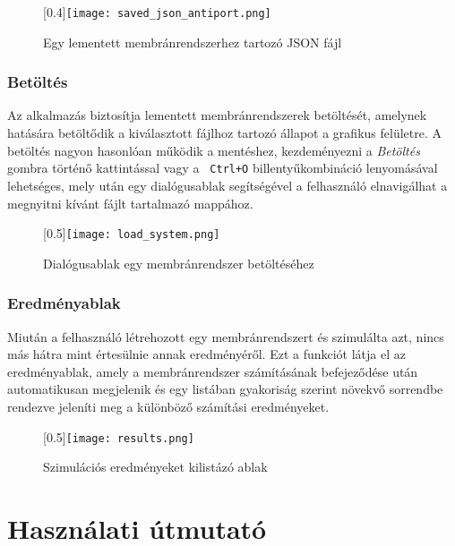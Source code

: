 \begin{figure}[H]
	\centering
	\scalebox{0.4}[0.4]{\texttt{[image: saved\_json\_antiport.png]}}
	\caption{Egy lementett membránrendszerhez tartozó JSON fájl  \protect\footnotemark}
	\label{fig:saved_json}
\end{figure}


\subsubsection{Betöltés}

Az alkalmazás biztosítja lementett membránrendszerek betöltését, amelynek hatására betöltődik a kiválasztott fájlhoz tartozó állapot a grafikus felületre.
A betöltés nagyon hasonlóan működik a mentéshez, kezdeményezni a \textit{Betöltés} gombra történő kattintással vagy a \verb| Ctrl+O| billentyűkombináció lenyomásával lehetséges, mely után egy dialógusablak segítségével a felhasználó elnavigálhat a megnyitni kívánt fájlt tartalmazó mappához.

\begin{figure}[H]
	\centering
	\scalebox{0.5}[0.5]{\texttt{[image: load\_system.png]}}
	\caption{Dialógusablak egy membránrendszer betöltéséhez}
	\label{fig:load_system}
\end{figure}

\subsubsection{Eredményablak}

Miután a felhasználó létrehozott egy membránrendszert és szimulálta azt, nincs más hátra mint értesülnie annak eredményéről.  Ezt a funkciót látja el az eredményablak, amely a membránrendszer számításának befejeződése után automatikusan megjelenik és egy listában gyakoriság szerint növekvő sorrendbe rendezve jeleníti meg a különböző számítási eredményeket.

\begin{figure}[H]
	\centering
	\scalebox{0.5}[0.5]{\texttt{[image: results.png]}}
	\caption{Szimulációs eredményeket kilistázó ablak}
	\label{fig:load_system}
\end{figure}

\section{Használati útmutató}\label{help}

